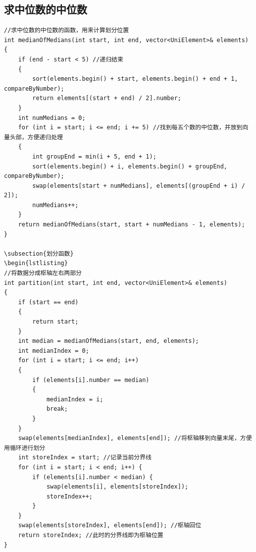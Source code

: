 \documentclass[UTF8]{ctexart}
\begin{document}
\subsection{求中位数的中位数}
\begin{lstlisting}
//求中位数的中位数的函数，用来计算划分位置
int medianOfMedians(int start, int end, vector<UniElement>& elements) 
{
    if (end - start < 5) //递归结束
    {
        sort(elements.begin() + start, elements.begin() + end + 1, compareByNumber);
        return elements[(start + end) / 2].number;
    }
    int numMedians = 0;
    for (int i = start; i <= end; i += 5) //找到每五个数的中位数，并放到向量头部，方便递归处理
    {
        int groupEnd = min(i + 5, end + 1);
        sort(elements.begin() + i, elements.begin() + groupEnd, compareByNumber);
        swap(elements[start + numMedians], elements[(groupEnd + i) / 2]);
        numMedians++;
    }
    return medianOfMedians(start, start + numMedians - 1, elements);
}

\subsection{划分函数}
\begin{lstlisting}
//将数据分成枢轴左右两部分
int partition(int start, int end, vector<UniElement>& elements) 
{
    if (start == end) 
    {
        return start;
    }
    int median = medianOfMedians(start, end, elements);
    int medianIndex = 0;
    for (int i = start; i <= end; i++) 
    {
        if (elements[i].number == median) 
        {
            medianIndex = i;
            break;
        }
    }
    swap(elements[medianIndex], elements[end]); //将枢轴移到向量末尾，方便用循环进行划分
    int storeIndex = start; //记录当前分界线
    for (int i = start; i < end; i++) {
        if (elements[i].number < median) {
            swap(elements[i], elements[storeIndex]);
            storeIndex++;
        }
    }
    swap(elements[storeIndex], elements[end]); //枢轴回位
    return storeIndex; //此时的分界线即为枢轴位置
}
\end{lstlisting}
\end{document}
